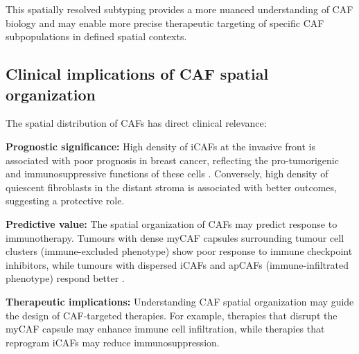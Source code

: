 This spatially resolved subtyping provides a more nuanced understanding of CAF biology and may enable more precise therapeutic targeting of specific CAF subpopulations in defined spatial contexts.

\subsection{Clinical implications of CAF spatial organization}

The spatial distribution of CAFs has direct clinical relevance:

\textbf{Prognostic significance:} High density of iCAFs at the invasive front is associated with poor prognosis in breast cancer, reflecting the pro-tumorigenic and immunosuppressive functions of these cells \citep{erve2024}. Conversely, high density of quiescent fibroblasts in the distant stroma is associated with better outcomes, suggesting a protective role.

\textbf{Predictive value:} The spatial organization of CAFs may predict response to immunotherapy. Tumours with dense myCAF capsules surrounding tumour cell clusters (immune-excluded phenotype) show poor response to immune checkpoint inhibitors, while tumours with dispersed iCAFs and apCAFs (immune-infiltrated phenotype) respond better \citep{chhabra2023}.

\textbf{Therapeutic implications:} Understanding CAF spatial organization may guide the design of CAF-targeted therapies. For example, therapies that disrupt the myCAF capsule may enhance immune cell infiltration, while therapies that reprogram iCAFs may reduce immunosuppression.
